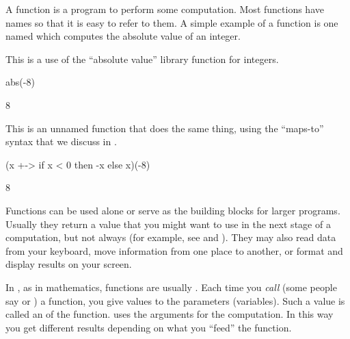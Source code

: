 A function is a program to perform some
computation.
Most functions have names so that it is easy to refer to them.
A simple example of a function is one named
 which
computes the absolute value of an integer.
%
\begin{xtc}
\begin{xtccomment}
This is a use of the ``absolute value'' library function for integers.
\end{xtccomment}
\begin{spadsrc}
abs(-8)
\end{spadsrc}
\begin{TeXOutput}
\begin{fricasmath}{1}
8%
\end{fricasmath}
\end{TeXOutput}
\end{xtc}
\begin{xtc}
\begin{xtccomment}
This is an unnamed function that does the same thing, using the
``maps-to'' syntax \spadSyntax{+->} that we discuss in
.
\end{xtccomment}
\begin{spadsrc}
(x +-> if x < 0 then -x else x)(-8)
\end{spadsrc}
\begin{TeXOutput}
\begin{fricasmath}{2}
8%
\end{fricasmath}
\end{TeXOutput}
\end{xtc}
%
Functions can be used alone or serve as the building blocks for larger
programs.
Usually they return a value that you might want to use in the next stage
of a computation, but not always (for example, see
 and ).
They may also read data from your keyboard, move information from one
place to another, or format and display results on your screen.

In \Language{}, as in mathematics, functions
are usually .
Each time you {\it call} (some people say  or
) a function, you give
values to the parameters (variables).
Such a value is called an  of
the function.
\Language{} uses the arguments for the computation.
In this way you get different results depending on what you ``feed'' the
function.

